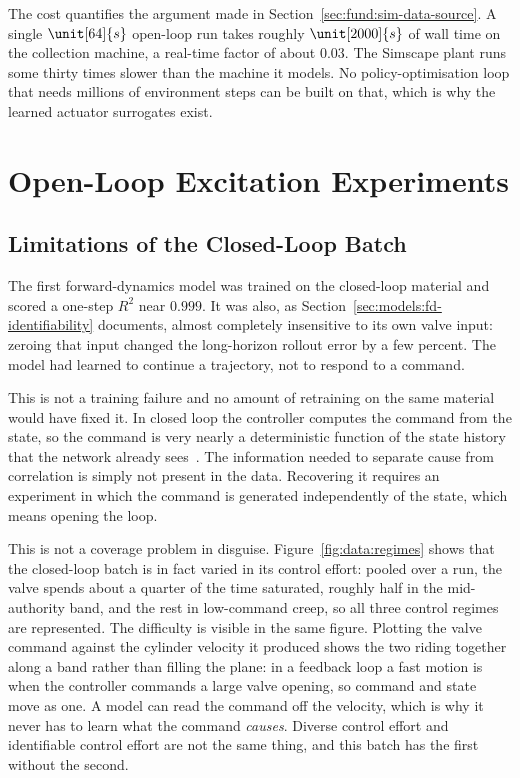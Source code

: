 The cost quantifies the argument made in
Section~\ref{sec:fund:sim-data-source}. A single
$\unit[64]{s}$ open-loop run takes roughly $\unit[2000]{s}$ of wall time
on the collection machine, a real-time factor of about $0.03$. The
Simscape plant runs some thirty times slower than the machine it
models. No policy-optimisation loop that needs millions of environment
steps can be built on that, which is why the learned actuator
surrogates exist.

\section{Open-Loop Excitation Experiments}
\label{sec:data:open-loop}

\subsection{Limitations of the Closed-Loop Batch}

The first forward-dynamics model was trained on the closed-loop material
and scored a one-step $R^2$ near $0.999$. It was also, as
Section~\ref{sec:models:fd-identifiability} documents, almost completely
insensitive to its own valve input: zeroing that input changed the
long-horizon rollout error by a few percent. The model had learned to
continue a trajectory, not to respond to a command.

This is not a training failure and no amount of retraining on the same
material would have fixed it. In closed loop the controller computes the
command from the state, so the command is very nearly a deterministic
function of the state history that the network already
sees~\cite{ljung1999system}. The information needed to separate cause
from correlation is simply not present in the data. Recovering it
requires an experiment in which the command is generated independently
of the state, which means opening the loop.

This is not a coverage problem in disguise.
Figure~\ref{fig:data:regimes} shows that the closed-loop batch is in
fact varied in its control effort: pooled over a run, the valve spends
about a quarter of the time saturated, roughly half in the mid-authority
band, and the rest in low-command creep, so all three control regimes
are represented. The difficulty is visible in the same figure. Plotting
the valve command against the cylinder velocity it produced shows the
two riding together along a band rather than filling the plane: in a
feedback loop a fast motion is when the controller commands a
large valve opening, so command and state move as one. A model can read
the command off the velocity, which is why it never has to learn what
the command \emph{causes}. Diverse control effort and identifiable
control effort are not the same thing, and this batch has the first
without the second.

